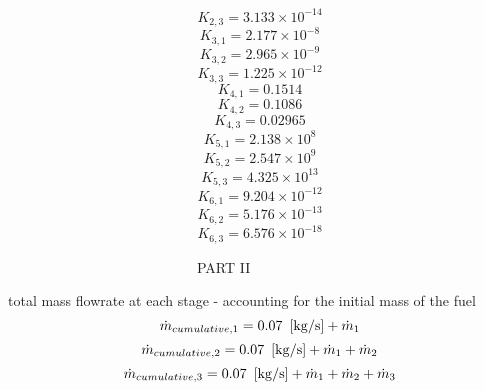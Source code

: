 \documentclass[10pt,fleqn]{article}
\begin{document}
\begin{equation}
\label{EES Eqn:65}
K_{2,3} = 3.133\times 10^{-14} 
\end{equation}
\begin{equation}
\label{EES Eqn:66}
K_{3,1} = 2.177\times 10^{-8} 
\end{equation}
\begin{equation}
\label{EES Eqn:67}
K_{3,2} = 2.965\times 10^{-9} 
\end{equation}
\begin{equation}
\label{EES Eqn:68}
K_{3,3} = 1.225\times 10^{-12} 
\end{equation}
\begin{equation}
\label{EES Eqn:69}
K_{4,1} = 0.1514 
\end{equation}
\begin{equation}
\label{EES Eqn:70}
K_{4,2} = 0.1086 
\end{equation}
\begin{equation}
\label{EES Eqn:71}
K_{4,3} = 0.02965 
\end{equation}
\begin{equation}
\label{EES Eqn:72}
K_{5,1} = 2.138\times 10^{8} 
\end{equation}
\begin{equation}
\label{EES Eqn:73}
K_{5,2} = 2.547\times 10^{9} 
\end{equation}
\begin{equation}
\label{EES Eqn:74}
K_{5,3} = 4.325\times 10^{13} 
\end{equation}
\begin{equation}
\label{EES Eqn:75}
K_{6,1} = 9.204\times 10^{-12} 
\end{equation}
\begin{equation}
\label{EES Eqn:76}
K_{6,2} = 5.176\times 10^{-13} 
\end{equation}
\begin{equation}
\label{EES Eqn:77}
K_{6,3} = 6.576\times 10^{-18} 
\end{equation}

\vspace{0.04in}
\noindent
\rm ~~~~~~~~~~~~~~~~~~~~~~~~~~~PART II~~~~~~~~~~~~~~~~~~~~~~~~~~~

\vspace{0.04in}
\noindent
\rm total mass flowrate at each stage - accounting for the initial mass of the fuel
\begin{equation}
\label{EES Eqn:78}
\dot {m}_{cumulative,1} = 0.07   \   \left[ \rm kg/s \right] + \dot {m}_{1} 
\end{equation}
\rm
\begin{equation}
\label{EES Eqn:79}
\dot {m}_{cumulative,2} = 0.07   \   \left[ \rm kg/s \right] + \dot {m}_{1} + \dot {m}_{2} 
\end{equation}
\rm
\begin{equation}
\label{EES Eqn:80}
\dot {m}_{cumulative,3} = 0.07   \   \left[ \rm kg/s \right] + \dot {m}_{1} + \dot {m}_{2} + \dot {m}_{3} 
\end{equation}
\rm
\end{document}
